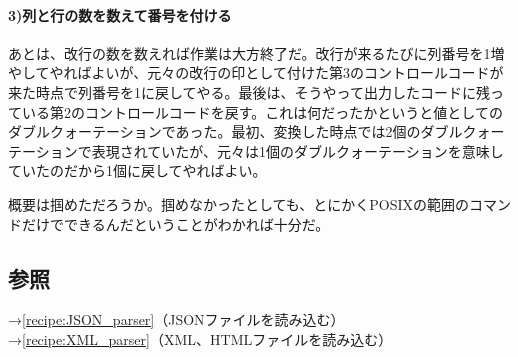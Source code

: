 \paragraph{3)列と行の数を数えて番号を付ける}
あとは、改行の数を数えれば作業は大方終了だ。改行が来るたびに列番号を1増やしてやればよいが、元々の改行の印として付けた第3のコントロールコードが来た時点で列番号を1に戻してやる。最後は、そうやって出力したコードに残っている第2のコントロールコードを戻す。これは何だったかというと値としてのダブルクォーテーションであった。最初、変換した時点では2個のダブルクォーテーションで表現されていたが、元々は1個のダブルクォーテーションを意味していたのだから1個に戻してやればよい。

概要は掴めただろうか。掴めなかったとしても、とにかくPOSIXの範囲のコマンドだけでできるんだということがわかれば十分だ。


\subsection*{参照}

\noindent
→\ref{recipe:JSON_parser}（JSONファイルを読み込む） \\
→\ref{recipe:XML_parser}（XML、HTMLファイルを読み込む）

